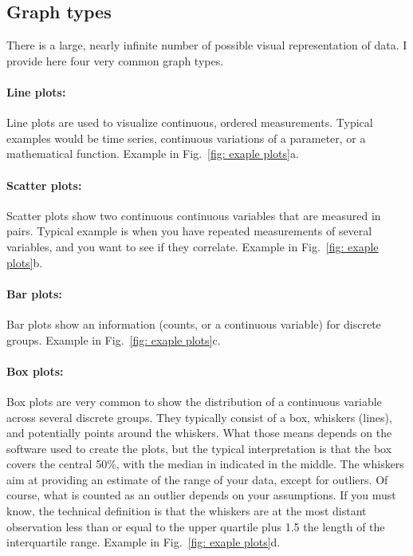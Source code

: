 \documentclass[a4paper,twoside]{tufte-book}\usepackage[]{graphicx}\usepackage[]{color}
\begin{document}
\subsection{Graph types}

There is a large, nearly infinite number of possible visual representation of data. I provide here four very common graph types. 

\paragraph{Line plots:} Line plots are used to visualize continuous, ordered measurements. Typical examples would be time series, continuous variations of a parameter, or a mathematical function. Example in Fig.~\ref{fig: exaple plots}a.

\paragraph{Scatter plots:} Scatter plots show two continuous continuous variables that are measured in pairs. Typical example is when you have repeated measurements of several variables, and you want to see if they correlate. Example in Fig.~\ref{fig: exaple plots}b.

\paragraph{Bar plots:} Bar plots show an information (counts, or a continuous variable) for discrete groups. Example in Fig.~\ref{fig: exaple plots}c.

\paragraph{Box plots:} Box plots are very common to show the distribution of a continuous variable across several discrete groups. They typically consist of a box, whiskers (lines), and potentially points around the whiskers. What those means depends on the software used to create the plots, but the typical interpretation is that the box covers the central 50\%, with the median in indicated in the middle. The whiskers aim at providing an estimate of the range of your data, except for outliers. Of course, what is counted as an outlier depends on your assumptions. If you must know, the technical definition is that the whiskers are at the most distant observation less than or equal to the upper quartile plus 1.5 the length of the interquartile range. Example in Fig.~\ref{fig: exaple plots}d.
\end{document}
